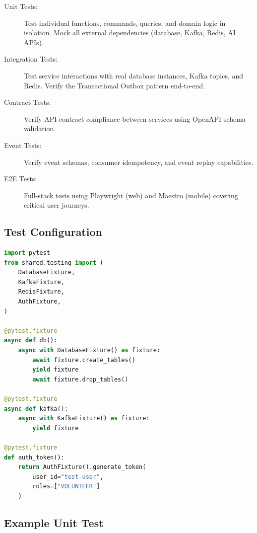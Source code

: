 \documentclass[11pt,a4paper]{article}
\begin{document}
\begin{description}
  \item[Unit Tests:] Test individual functions, commands, queries, and domain logic in isolation. Mock all external dependencies (database, Kafka, Redis, AI APIs).
  \item[Integration Tests:] Test service interactions with real database instances, Kafka topics, and Redis. Verify the Transactional Outbox pattern end-to-end.
  \item[Contract Tests:] Verify API contract compliance between services using OpenAPI schema validation.
  \item[Event Tests:] Verify event schemas, consumer idempotency, and event replay capabilities.
  \item[E2E Tests:] Full-stack tests using Playwright (web) and Maestro (mobile) covering critical user journeys.
\end{description}

\subsection{Test Configuration}

\begin{lstlisting}[language=Python, caption=Test Fixtures]
import pytest
from shared.testing import (
    DatabaseFixture,
    KafkaFixture,
    RedisFixture,
    AuthFixture,
)

@pytest.fixture
async def db():
    async with DatabaseFixture() as fixture:
        await fixture.create_tables()
        yield fixture
        await fixture.drop_tables()

@pytest.fixture
async def kafka():
    async with KafkaFixture() as fixture:
        yield fixture

@pytest.fixture
def auth_token():
    return AuthFixture().generate_token(
        user_id="test-user",
        roles=["VOLUNTEER"]
    )
\end{lstlisting}

\subsection{Example Unit Test}
\end{document}
